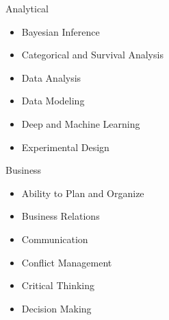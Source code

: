 
\begin{multicols*}{3}
\vspace*{-0.3 in}
\Competencies
{Analytical}
{\begin{itemize}
    \item Bayesian Inference
    \item Categorical and Survival Analysis
    \item Data Analysis
    \item Data Modeling
    \item Deep and Machine Learning
    \item Experimental Design
\end{itemize}}

\vspace*{-0.3 in}
\Competencies
{Business}
{\begin{itemize}
    \item Ability to Plan and Organize
    \item Business Relations
    \item Communication
    \item Conflict Management
    \item Critical Thinking
    \item Decision Making
\end{itemize}}


\end{multicols*}
